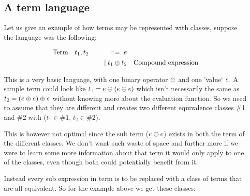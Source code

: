 




\subsection{A term language}


Let us give an example of how terms may be represented with classes, suppose the
language was the following:

\begin{equation*}
\begin{aligned}
\text{Term} \quad & t_1,t_2 \quad & ::= \; e & \\
 & & \; | \; t_1 \oplus t_2  & \quad \text{Compound expression} \\
\end{aligned}
\end{equation*}

This is a very basic language, with one binary operator $\oplus$ and one 'value` $e$. 
A sample term could look like
$t_1 = e \oplus (e \oplus e)$
which isn't necessarily the same as 
$t_2 = (e \oplus e) \oplus e$
without knowing more about the evaluation function.
So we need to assume that they are different and creates two different equivalence
classes \#1 and \#2 with ($t_1 \in \#1$, $t_2 \in \#2$).

This is however not optimal since the sub term ($e \oplus e$) exists
in both the term of the different classes. We don't want such waste of space and 
further more if we were to learn some more information about that term it
would only apply to one of the classes, even though both could potentially benefit from it. 


Instead every sub expression in term is to be replaced with a class of terms that are all equivalent.
So for the example above we get these classes:

